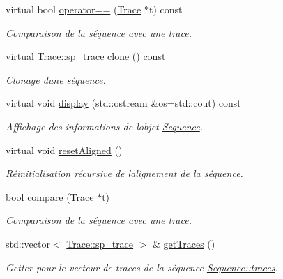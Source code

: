 \begin{DoxyCompactItemize}
virtual bool \hyperlink{class_sequence_a945e1cb29fadc554bc8a3d61f188998c}{operator==} (\hyperlink{class_trace}{Trace} $\ast$t) const 
\begin{DoxyCompactList}\small\item\em Comparaison de la séquence avec une trace. \end{DoxyCompactList}\item 
virtual \hyperlink{class_trace_a9c58e523529fc8a03fb6acf3eef86150}{Trace\+::sp\+\_\+trace} \hyperlink{class_sequence_aad8c31973496749c3e57848af2812284}{clone} () const 
\begin{DoxyCompactList}\small\item\em Clonage d\textquotesingle{}une séquence. \end{DoxyCompactList}\item 
virtual void \hyperlink{class_sequence_a19d7d6f49253cbaae84cc802760c7d38}{display} (std\+::ostream \&os=std\+::cout) const 
\begin{DoxyCompactList}\small\item\em Affichage des informations de l\textquotesingle{}objet \hyperlink{class_sequence}{Sequence}. \end{DoxyCompactList}\item 
virtual void \hyperlink{class_sequence_aacd81267429077588208d2a040ea51e4}{reset\+Aligned} ()
\begin{DoxyCompactList}\small\item\em Réinitialisation récursive de l\textquotesingle{}alignement de la séquence. \end{DoxyCompactList}\item 
bool \hyperlink{class_sequence_a1d6dedda9e2b8bb5489a7cca5e21a220}{compare} (\hyperlink{class_trace}{Trace} $\ast$t)
\begin{DoxyCompactList}\small\item\em Comparaison de la séquence avec une trace. \end{DoxyCompactList}\item 
std\+::vector$<$ \hyperlink{class_trace_a9c58e523529fc8a03fb6acf3eef86150}{Trace\+::sp\+\_\+trace} $>$ \& \hyperlink{class_sequence_a4d3e82279c084b43f99171b6dc2ad4eb}{get\+Traces} ()
\begin{DoxyCompactList}\small\item\em Getter pour le vecteur de traces de la séquence \hyperlink{class_sequence_a2e22b6d3eda29911dda95aa36efefa83}{Sequence\+::traces}. \end{DoxyCompactList}\item 

\end{DoxyCompactItemize}
